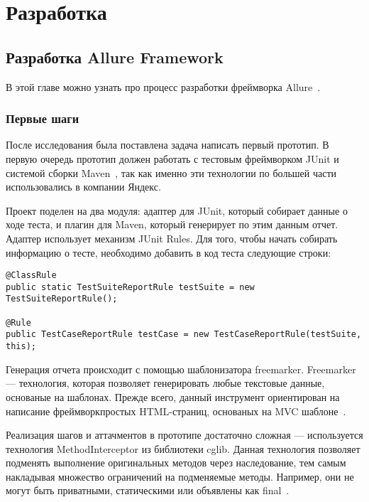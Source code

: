 \chapter{Разработка} 
\label{chapter3}

\section{Разработка Allure Framework}

В этой главе можно узнать про процесс разработки фреймворка Allure~\cite{allure_home}.

\subsection{Первые шаги}

После исследования была поставлена задача написать первый прототип. В первую очередь прототип должен работать с тестовым фреймворком JUnit и системой сборки Maven~\cite{maven_guide}, так как именно эти технологии по большей части использовались в компании Яндекс. 

Проект поделен на два модуля: адаптер для JUnit, который собирает данные о ходе теста, и плагин для Maven, который генерирует по этим данным отчет. Адаптер использует механизм JUnit Rules. Для того, чтобы начать собирать информацию о тесте, необходимо добавить в код теста следующие строки:

\begin{lstlisting}[caption=Пример подключения к тестам JUnit Rules.]
@ClassRule
public static TestSuiteReportRule testSuite = new TestSuiteReportRule();

@Rule
public TestCaseReportRule testCase = new TestCaseReportRule(testSuite, this);
\end{lstlisting}


Генерация отчета происходит с помощью шаблонизатора freemarker. Freemarker --- технология, которая позволяет генерировать любые текстовые данные, основаные на шаблонах. Прежде всего, данный инструмент ориентирован на написание фреймворкпростых HTML-страниц, основаных на MVC шаблоне~\cite{freemarker_home}.

Реализация шагов и аттачментов в прототипе достаточно сложная --- используется технология MethodInterceptor из библиотеки cglib. Данная технология позволяет подменять выполнение оригинальных методов через наследование, тем самым накладывая множество ограничений на подменяемые методы. Например, они не могут быть приватными, статическими или объявлены как final~\cite{cglib_home}. 


